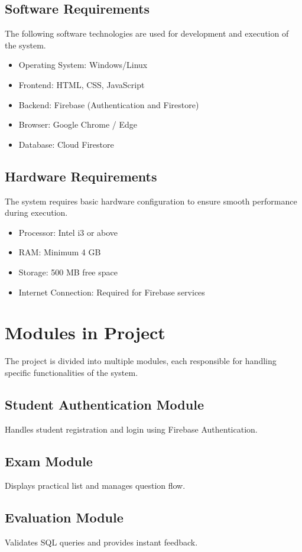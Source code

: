 \documentclass{SSBT-BE}
\begin{document}
\subsection{Software Requirements}
The following software technologies are used for development and execution of the system.
\begin{itemize}
\item Operating System: Windows/Linux
\item Frontend: HTML, CSS, JavaScript
\item Backend: Firebase (Authentication and Firestore)
\item Browser: Google Chrome / Edge
\item Database: Cloud Firestore
\end{itemize}

\subsection{Hardware Requirements}
The system requires basic hardware configuration to ensure smooth performance during execution.
\begin{itemize}
\item Processor: Intel i3 or above
\item RAM: Minimum 4 GB
\item Storage: 500 MB free space
\item Internet Connection: Required for Firebase services
\end{itemize}

\section{Modules in Project}
The project is divided into multiple modules, each responsible for handling specific functionalities of the system.
\subsection{Student Authentication Module}
Handles student registration and login using Firebase Authentication.


\subsection{Exam Module}
Displays practical list and manages question flow.

\subsection{Evaluation Module}
Validates SQL queries and provides instant feedback.
\end{document}
